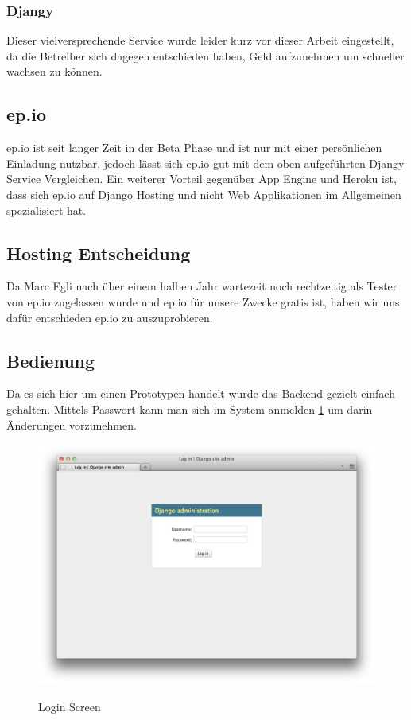 \subsubsection{Djangy} %
\label{ssub:Djangy}
Dieser vielversprechende Service wurde leider kurz vor dieser Arbeit eingestellt, da die Betreiber sich dagegen entschieden haben, Geld aufzunehmen um schneller wachsen zu können.

\subsection{ep.io} %
\label{sub:ep.io}
ep.io ist seit langer Zeit in der Beta Phase und ist nur mit einer persönlichen Einladung nutzbar, jedoch lässt sich ep.io gut mit dem oben aufgeführten Djangy Service Vergleichen. Ein weiterer Vorteil gegenüber App Engine und Heroku ist, dass sich ep.io auf Django Hosting und nicht Web Applikationen im Allgemeinen spezialisiert hat.


\subsection{Hosting Entscheidung} %
\label{sub:Hosting Entscheidung}
Da Marc Egli nach über einem halben Jahr wartezeit noch rechtzeitig als Tester von ep.io zugelassen wurde und ep.io für unsere Zwecke gratis ist, haben wir uns dafür entschieden ep.io zu auszuprobieren.

\subsection{Bedienung} %
\label{sub:Bedienung}
Da es sich hier um einen Prototypen handelt wurde das Backend gezielt einfach gehalten. Mittels Passwort kann man sich im System anmelden \ref{fig:admin-login} um darin Änderungen vorzunehmen.

\begin{figure}[H]
	\centering			      
        \includegraphics[scale=0.3]{images/admin-login.png}\\
		\caption{Login Screen}
	\label{fig:admin-login}
\end{figure}

